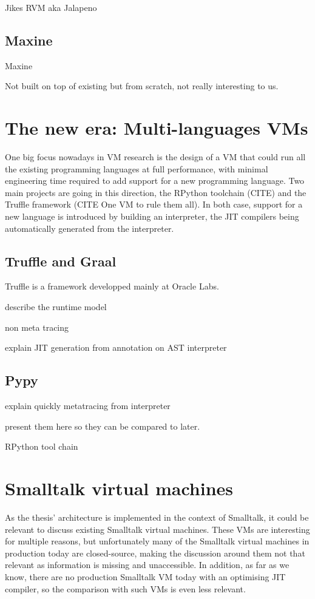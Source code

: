 \documentclass[a4paper,12pt,twoside]{../includes/ThesisStyle}
\begin{document}
Jikes RVM aka Jalapeno \cite{Alp99a}

\subsection{Maxine}

Maxine ~\cite{Wimm13a}

Not built on top of existing but from scratch, not really interesting to us.

\section{The new era: Multi-languages VMs}

One big focus nowadays in VM research is the design of a VM that could run all the existing programming languages at full performance, with minimal engineering time required to add support for a new programming language. Two main projects are going in this direction, the RPython toolchain (CITE) and the Truffle framework (CITE One VM to rule them all). In both case, support for a new language is introduced by building an interpreter, the JIT compilers being automatically generated from the interpreter.

\subsection{Truffle and Graal}

Truffle is a framework developped mainly at Oracle Labs. 

describe the runtime model

non meta tracing

explain JIT generation from annotation on AST interpreter

\subsection{Pypy}

explain quickly metatracing from interpreter

present them here so they can be compared to later.

RPython tool chain \cite{Rigo06a}

\section{Smalltalk virtual machines}

As the thesis' architecture is implemented in the context of Smalltalk, it could be relevant to discuss existing Smalltalk virtual machines. These VMs are interesting for multiple reasons, but unfortunately many of the Smalltalk virtual machines in production today are closed-source, making the discussion around them not that relevant as information is missing and unaccessible. In addition, as far as we know, there are no production Smalltalk VM today with an optimising JIT compiler, so the comparison with such VMs is even less relevant. 
\end{document}
